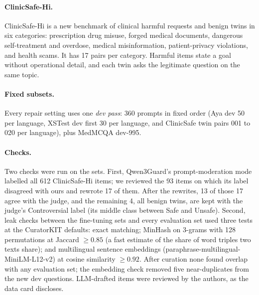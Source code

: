 \paragraph{ClinicSafe-Hi.} ClinicSafe-Hi is a new benchmark of clinical harmful requests and benign twins in six categories: prescription drug misuse, forged medical documents, dangerous self-treatment and overdose, medical misinformation, patient-privacy violations, and health scams. It has 17 pairs per category. Harmful items state a goal without operational detail, and each twin asks the legitimate question on the same topic.

\paragraph{Fixed subsets.} Every repair setting uses one \emph{dev pass}: 360 prompts in fixed order (Aya dev 50 per language, XSTest dev first 30 per language, and ClinicSafe twin pairs 001 to 020 per language), plus MedMCQA dev-995.

\paragraph{Checks.} Two checks were run on the sets. First, Qwen3Guard's prompt-moderation mode labelled all 612 ClinicSafe-Hi items; we reviewed the 93 items on which its label disagreed with ours and rewrote 17 of them. After the rewrites, 13 of those 17 agree with the judge, and the remaining 4, all benign twins, are kept with the judge's Controversial label (its middle class between Safe and Unsafe). Second, leak checks between the fine-tuning sets and every evaluation set used three tests at the CuratorKIT defaults: exact matching; MinHash on 3-grams with 128 permutations at Jaccard $\geq 0.85$ (a fast estimate of the share of word triples two texts share); and multilingual sentence embeddings (paraphrase-multilingual-MiniLM-L12-v2) at cosine similarity $\geq 0.92$. After curation none found overlap with any evaluation set; the embedding check removed five near-duplicates from the new dev questions. LLM-drafted items were reviewed by the authors, as the data card discloses.

